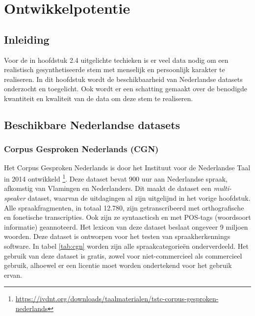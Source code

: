 \chapter{Ontwikkelpotentie}

\begin{center}
  \begin{minipage}{0.5\textwidth}
    \begin{small}
    \end{small}
  \end{minipage}
  \vspace{0.5cm}
\end{center}

\section{Inleiding}

Voor de in hoofdstuk 2.4 uitgelichte techieken is er veel data nodig om een realistisch gesynthetiseerde stem met menselijk en persoonlijk karakter te realiseren. In dit hoofdstuk wordt de beschikbaarheid van Nederlandse datasets onderzocht en toegelicht. Ook wordt er een schatting gemaakt over de benodigde kwantiteit en kwaliteit van de data om deze stem te realiseren.


\section{Beschikbare Nederlandse datasets}

\subsection{Corpus Gesproken Nederlands (CGN)}
Het Corpus Gesproken Nederlands is door het Instituut voor de Nederlandse Taal in 2014 ontwikkeld \footnote{\url{https://ivdnt.org/downloads/taalmaterialen/tstc-corpus-gesproken-nederlands}}. Deze dataset bevat 900 uur aan Nederlandse spraak, afkomstig van Vlamingen en Nederlanders. Dit maakt de dataset een \textit{multi-speaker} dataset, waarvan de uitdagingen al zijn uitgelijnd in het vorige hoofdstuk. Alle spraakfragmenten, in totaal 12.780, zijn getranscribeerd met orthografische en fonetische transcripties. Ook zijn ze syntaacticsh en met POS-tags (woordsoort informatie) geannoteerd. Het lexicon van deze dataset beslaat ongeveer 9 miljoen woorden. Deze dataset is ontworpen voor het testen van spraakherkennings software. In tabel \ref{tab:cgn} worden zijn alle spraakcategorieën onderverdeeld. Het gebruik van deze dataset is gratis, zowel voor niet-commercieel als commercieel gebruik, alhoewel er een licentie moet worden ondertekend voor het gebruik ervan.

